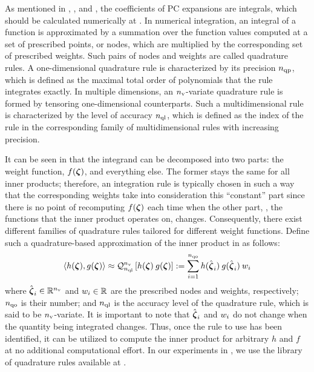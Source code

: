 As mentioned in , , and , the coefficients of PC expansions are integrals, which should be calculated numerically at .
In numerical integration, an integral of a function is approximated by a summation over the function values computed at a set of prescribed points, or nodes, which are multiplied by the corresponding set of prescribed weights.
Such pairs of nodes and weights are called quadrature rules.
A one-dimensional quadrature rule is characterized by its precision ${n_\text{qp}}$, which is defined as the maximal total order \cite{heiss2008} of polynomials that the rule integrates exactly.
In multiple dimensions, an ${n_\text{v}}$-variate quadrature rule is formed by tensoring one-dimensional counterparts. Such a multidimensional rule is characterized by the level of accuracy ${n_\text{ql}}$, which is defined as the index of the rule in the corresponding family of multidimensional rules with increasing precision.

It can be seen in  that the integrand can be decomposed into two parts: the weight function, $f(\boldsymbol{\zeta})$, and everything else.
The former stays the same for all inner products; therefore, an integration rule is typically chosen in such a way that the corresponding weights take into consideration this ``constant'' part since there is no point of recomputing $f(\boldsymbol{\zeta})$ each time when the other part, \ie, the functions that the inner product operates on, changes.
Consequently, there exist different families of quadrature rules tailored for different weight functions.
Define such a quadrature-based approximation of the inner product in  as follows:
\[
  \oInner{h(\vz)}{g(\vz)} \approx \oQuad{\nvars}{\qdlevel}{h(\vz) \: g(\vz)} := \sum_{i = 1}^{\qdorder} h(\qdn{\vz}_i) \: g(\qdn{\vz}_i) \: \qdw_i
\]
where $\hat{\boldsymbol{\zeta}}_i \in \mathbb{R}^{n_\text{v}}$ and $w_i \in \mathbb{R}$ are the prescribed nodes and weights, respectively; ${n_\text{qo}}$ is their number; and ${n_\text{ql}}$ is the accuracy level of the quadrature rule, which is said to be ${n_\text{v}}$-variate.
It is important to note that $\hat{\boldsymbol{\zeta}}_i$ and $w_i$ do not change when the quantity being integrated changes.
Thus, once the rule to use has been identified, it can be utilized to compute the inner product for arbitrary $h$ and $f$ at no additional computational effort.
In our experiments in , we use the library of quadrature rules available at \cite{burkardt2013}.

